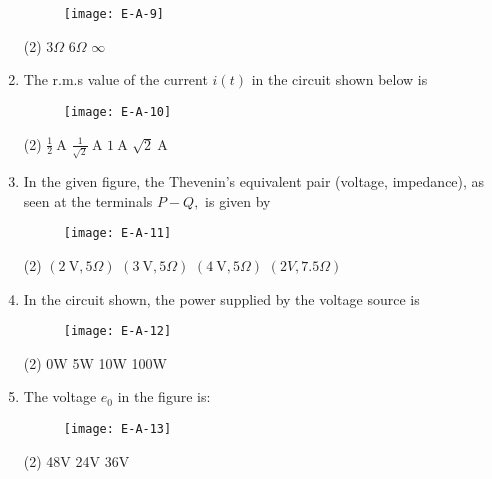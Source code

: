 \begin{enumerate}
	\begin{figure}[H]
		\centering
		\texttt{[image: E-A-9]}
	\end{figure}
	 \begin{tasks}(2)
		\task[\textbf{b.}]$3\Omega$
		\task[\textbf{c.}]$6\Omega$
		\task[\textbf{d.}] $\infty$
	\end{tasks}
	\item The r.m.s value of the current $i(t)$ in the circuit shown below is 
	\begin{figure}[H]
		\centering
		\texttt{[image: E-A-10]}
		\caption{}
		\label{}
	\end{figure}
	 \begin{tasks}(2)
		\task[\textbf{a.}]$\frac{1}{2} \mathrm{~A}$
		\task[\textbf{b.}] $\frac{1}{\sqrt{2}} \mathrm{~A}$
		\task[\textbf{c.}]$1 \mathrm{~A}$
		\task[\textbf{d.}]  $\sqrt{2} \mathrm{~A}$
	\end{tasks}
\item In the given figure, the Thevenin's equivalent pair (voltage, impedance), as seen at the terminals $P-Q,$ is given by
\begin{figure}[H]
	\centering
	\texttt{[image: E-A-11]}
	\caption{}
	\label{}
\end{figure}
	 \begin{tasks}(2)
		\task[\textbf{a.}]$(2 \mathrm{~V}, 5 \Omega)$
		\task[\textbf{b.}]$(3 \mathrm{~V}, 5 \Omega)$
		\task[\textbf{c.}] $(4 \mathrm{~V}, 5 \Omega)$
		\task[\textbf{d.}] $(2 V, 7.5 \Omega)$
	\end{tasks}
	\item In the circuit shown, the power supplied by the voltage source is
	\begin{figure}[H]
		\centering
		\texttt{[image: E-A-12]}
		\caption{}
		\label{}
	\end{figure}
 \begin{tasks}(2)
	\task[\textbf{a.}]0W
	\task[\textbf{b.}]5W
	\task[\textbf{c.}]10W
	\task[\textbf{d.}]100W
\end{tasks}
	\item The voltage $e_{0}$ in the figure is:
	\begin{figure}[H]
		\centering
		\texttt{[image: E-A-13]}
		\caption{}
		\label{}
	\end{figure}
	 \begin{tasks}(2)
		\task[\textbf{a.}]48V
		\task[\textbf{b.}]24V
		\task[\textbf{c.}]36V

\end{tasks}
\end{enumerate}

